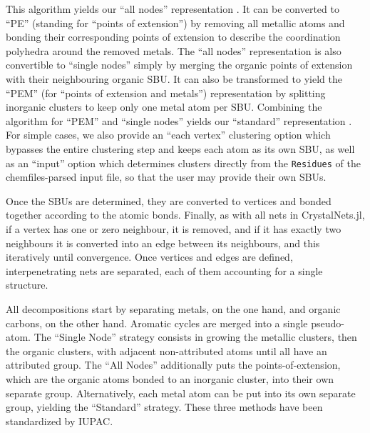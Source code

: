 \documentclass[main.tex]{subfiles}
\begin{document}
This algorithm yields our ``all nodes'' representation \autocite{IUPAC_SBU}. It can be converted to ``PE'' (standing for ``points of extension'') \autocite{UnifiedTopology,YaghiRodMOFs} by removing all metallic atoms and bonding their corresponding points of extension to describe the coordination polyhedra around the removed metals. The ``all nodes'' representation is also convertible to ``single nodes'' \autocite{IUPAC_SBU} simply by merging the organic points of extension with their neighbouring organic SBU. It can also be transformed to yield the ``PEM'' (for ``points of extension and metals'') representation \autocite{ProserpioPEM,UnifiedTopology} by splitting inorganic clusters to keep only one metal atom per SBU. Combining the algorithm for ``PEM'' and ``single nodes'' yields our ``standard'' representation \autocite{BlatovSimplify}. For simple cases, we also provide an ``each vertex'' clustering option which bypasses the entire clustering step and keeps each atom as its own SBU, as well as an ``input'' option which determines clusters directly from the \texttt{Residues} of the chemfiles-parsed input file, so that the user may provide their own SBUs.


Once the SBUs are determined, they are converted to vertices and bonded together according to the atomic bonds. %
Finally, as with all nets in CrystalNets.jl, if a vertex has one or zero neighbour, it is removed, and if it has exactly two neighbours it is converted into an edge between its neighbours, and this iteratively until convergence. Once vertices and edges are defined, interpenetrating nets are separated, each of them accounting for a single structure.


All decompositions start by separating metals, on the one hand, and organic carbons, on the other hand. Aromatic cycles are merged into a single pseudo-atom. The ``Single Node'' strategy consists in growing the metallic clusters, then the organic clusters, with adjacent non-attributed atoms until all have an attributed group. The ``All Nodes'' additionally puts the points-of-extension, which are the organic atoms bonded to an inorganic cluster, into their own separate group. Alternatively, each metal atom can be put into its own separate group, yielding the ``Standard'' strategy. These three methods have been standardized by IUPAC.
\end{document}
